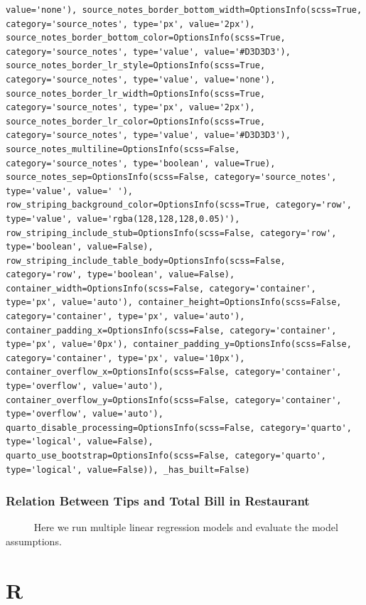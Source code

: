 \documentclass[
  letterpaper,
  DIV=11,
  numbers=noendperiod]{scrreprt}
\newcounter{none} %
\begin{document}
\begin{table}
{\begin{verbatim}
value='none'), source_notes_border_bottom_width=OptionsInfo(scss=True, category='source_notes', type='px', value='2px'), source_notes_border_bottom_color=OptionsInfo(scss=True, category='source_notes', type='value', value='#D3D3D3'), source_notes_border_lr_style=OptionsInfo(scss=True, category='source_notes', type='value', value='none'), source_notes_border_lr_width=OptionsInfo(scss=True, category='source_notes', type='px', value='2px'), source_notes_border_lr_color=OptionsInfo(scss=True, category='source_notes', type='value', value='#D3D3D3'), source_notes_multiline=OptionsInfo(scss=False, category='source_notes', type='boolean', value=True), source_notes_sep=OptionsInfo(scss=False, category='source_notes', type='value', value=' '), row_striping_background_color=OptionsInfo(scss=True, category='row', type='value', value='rgba(128,128,128,0.05)'), row_striping_include_stub=OptionsInfo(scss=False, category='row', type='boolean', value=False), row_striping_include_table_body=OptionsInfo(scss=False, category='row', type='boolean', value=False), container_width=OptionsInfo(scss=False, category='container', type='px', value='auto'), container_height=OptionsInfo(scss=False, category='container', type='px', value='auto'), container_padding_x=OptionsInfo(scss=False, category='container', type='px', value='0px'), container_padding_y=OptionsInfo(scss=False, category='container', type='px', value='10px'), container_overflow_x=OptionsInfo(scss=False, category='container', type='overflow', value='auto'), container_overflow_y=OptionsInfo(scss=False, category='container', type='overflow', value='auto'), quarto_disable_processing=OptionsInfo(scss=False, category='quarto', type='logical', value=False), quarto_use_bootstrap=OptionsInfo(scss=False, category='quarto', type='logical', value=False)), _has_built=False)
\end{verbatim}

}

\end{table}%

\subsubsection{Relation Between Tips and Total Bill in
Restaurant}\label{relation-between-tips-and-total-bill-in-restaurant}

~~~~~ Here we run multiple linear regression models and evaluate the
model assumptions.

\section{R}
\end{document}
